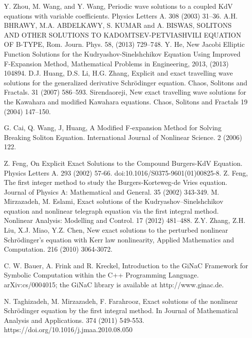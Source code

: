\documentclass[prd,aps,floats,showkeys,nofootinbib,notitlepage]{revtex4-2}
\begin{document}
	\begin{thebibliography}{00}
		 Y. Zhou, M. Wang, and Y. Wang, Periodic wave solutions to a coupled KdV equations with variable coefficients. Physics Letters A. 308 (2003) 31–36.
		 A.H. BHRAWY, M.A. ABDELKAWY, S. KUMAR and A. BISWAS, SOLITONS AND OTHER SOLUTIONS TO KADOMTSEV-PETVIASHVILI EQUATION OF B-TYPE, Rom. Journ. Phys. 58, (2013) 729–748.
		  Y. He, New Jacobi Elliptic Function Solutions for the Kudryashov-Sinelshchikov Equation Using Improved F-Expansion Method, Mathematical Problems in Engineering, 2013, (2013) 104894.
		 D.J. Huang, D.S. Li, H.G. Zhang, Explicit and exact travelling wave solutions for the generalized derivative Schr\"odinger equation. Chaos, Solitons and Fractals. 31 (2007) 586–593.
		 Sirendaoreji, New exact travelling wave solutions for the Kawahara and modified Kawahara equations. Chaos, Solitons and Fractals 19 (2004) 147–150.
		
		 G. Cai, Q. Wang, J, Huang, A Modified F-expansion Method for Solving Breaking Soliton Equation. International Journal of Nonlinear Science. 2 (2006) 122.
				
		 Z. Feng, On Explicit Exact Solutions to the Compound Burgers-KdV Equation. Physics Letters A. 293 (2002) 57-66. doi:10.1016/S0375-9601(01)00825-8.
		 Z. Feng, The first integer method to study the Burgers-Korteweg-de Vries equation. Journal of Physics A: Mathematical and General. 35 (2002) 343-349.
		 M. Mirzazadeh, M. Eslami, Exact solutions of the Kudryashov–Sinelshchikov equation and nonlinear telegraph equation via the first integral method. Nonlinear Analysis: Modelling and Control. 17 (2012) 481–488.
		 Z.Y. Zhang, Z.H. Liu, X.J. Miao, Y.Z. Chen, New exact solutions to the perturbed nonlinear Schr\"odinger’s equation with Kerr law nonlinearity, Applied Mathematics and Computation. 216 (2010) 3064-3072.
			
		 C. W. Bauer, A. Frink and R. Kreckel, Introduction to the GiNaC Framework for Symbolic Computation within the C++ Programming Language. arXiv:cs/0004015; the GiNaC library is available at http://www.ginac.de.
		
		 N. Taghizadeh, M. Mirzazadeh, F. Farahrooz, Exact solutions of the nonlinear Schrödinger equation by the first integral method. In Journal of Mathematical Analysis and Applications. 374 (2011) 549-553. https://doi.org/10.1016/j.jmaa.2010.08.050
		

\end{thebibliography}
\end{document}
